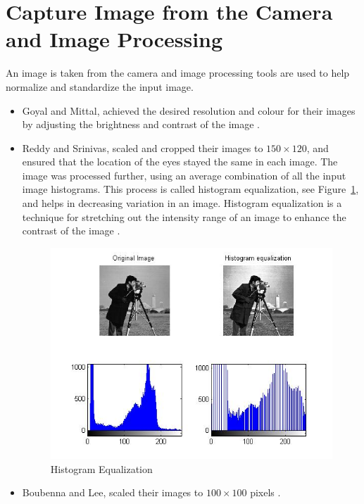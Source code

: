 \section{Capture Image from the Camera and Image Processing}
An image is taken from the camera and image processing tools are used to help normalize and standardize the input image.
\begin{itemize}

\item Goyal and Mittal, achieved the desired resolution and colour for their images by adjusting the brightness and contrast of the image \cite{1}.

\item Reddy and Srinivas, scaled and cropped their images to \textit{$150\times120$}, and ensured that the location of the eyes stayed the same in each image. The image was processed further, using an average combination of all the input image histograms. This process is called histogram equalization, see Figure~\ref{fig:hist eq}, and helps in decreasing variation in an image. Histogram equalization is a technique for stretching out the intensity range of an image to enhance the contrast of the image \cite{2}.

\begin{figure}[ht]
  \centering
  \includegraphics[scale=0.6]{5}
  \caption{Histogram Equalization}
  \label{fig:hist eq}
\end{figure}

\item Boubenna and Lee, scaled their images to \textit{$100\times100$} pixels \cite{3}.

\end{itemize}
